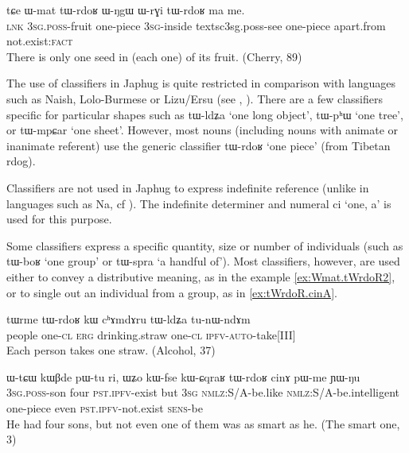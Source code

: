 \documentclass[oldfontcommands,oneside,a4paper,12pt]{article}
\newcommand{\ipa}[1]{{\phon#1}}
\begin{document}
\begin{exe}
\ex \label{ex:Wmat.tWrdoR}
\gll 
\ipa{tɕe} 	\ipa{ɯ-mat} 	\ipa{tɯ-rdoʁ} 	\ipa{ɯ-ŋgɯ} 	\ipa{ɯ-rɣi} 	\ipa{tɯ-rdoʁ} 	\ipa{ma} 	\ipa{me.} \\
\textsc{lnk} \textsc{3sg.poss}-fruit  one-piece \textsc{3sg}-inside textsc{3sg.poss}-see  one-piece apart.from not.exist:\textsc{fact} \\
\glt There is only one seed in (each one) of its fruit. (Cherry, 89)
\end{exe}

The use of classifiers in Japhug is quite restricted in comparison with languages such as Naish, Lolo-Burmese or Lizu/Ersu (see \citealt[216-224]{lidz10na}, \citealt{zhang14classifiers}). There are a few classifiers specific for particular shapes such as \ipa{tɯ-ldʑa} `one long object', \ipa{tɯ-pʰɯ} `one tree', or \ipa{tɯ-mpɕar} `one sheet'. However, most nouns (including nouns with animate or inanimate referent) use the generic classifier \ipa{tɯ-rdoʁ} `one piece' (from Tibetan \ipa{rdog}).  

Classifiers are not used in Japhug to express indefinite reference (unlike in languages such as Na, cf \citealt[206]{lidz10na}). The indefinite determiner and numeral \ipa{ci} `one, a' is used for this purpose.

Some classifiers express a specific quantity,  size or number of individuals (such as \ipa{tɯ-boʁ} `one group' or \ipa{tɯ-spra} `a handful of'). Most classifiers, however, are used either to convey a distributive meaning, as in the example \ref{ex:Wmat.tWrdoR2}, or to single out an individual from a group, as in \ref{ex:tWrdoR.cinA}.
 
\begin{exe}
\ex \label{ex:Wmat.tWrdoR2}
\gll 
\ipa{tɯrme} 	\ipa{tɯ-rdoʁ} 	\ipa{kɯ} 	\ipa{cʰɤmdɤru} 	\ipa{tɯ-ldʑa} 	\ipa{tu-nɯ-ndɤm} \\
people one-\textsc{cl} \textsc{erg} drinking.straw one-\textsc{cl} \textsc{ipfv-auto}-take[III] \\
\glt Each person takes one straw. (Alcohol, 37)
\end{exe}
 
\begin{exe}
\ex \label{ex:tWrdoR.cinA}
\gll 
\ipa{ɯ-tɕɯ} 	\ipa{kɯβde} 	\ipa{pɯ-tu} 	\ipa{ri,} 	\ipa{ɯʑo} 	\ipa{kɯ-fse} 	\ipa{kɯ-ɕqraʁ} 	\ipa{tɯ-rdoʁ} 	\ipa{cinɤ} 	\ipa{pɯ-me} 	\ipa{ɲɯ-ŋu} 	\\
\textsc{3sg.poss}-son four \textsc{pst.ipfv}-exist but \textsc{3sg} \textsc{nmlz}:S/A-be.like \textsc{nmlz}:S/A-be.intelligent one-piece even \textsc{pst.ipfv}-not.exist \textsc{sens}-be \\
\glt He had four sons, but not even one of them was as smart as he. (The smart one, 3)
\end{exe} 
 
\end{document}
